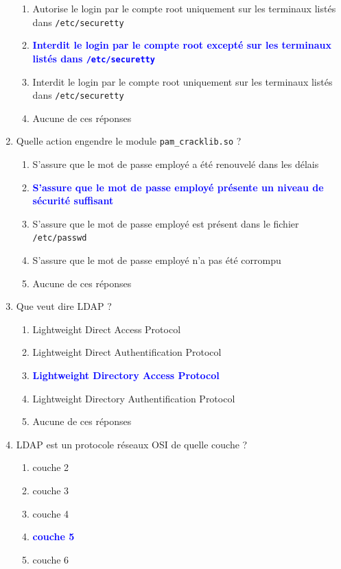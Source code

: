 \documentclass[a4paper]{article}
\begin{document}
\begin{enumerate}
\begin{enumerate}
        \item Autorise le login par le compte root uniquement sur les terminaux listés dans \texttt{/etc/securetty}
        \item \textcolor{blue}{\textbf{Interdit le login par le compte root excepté sur les terminaux listés dans \texttt{/etc/securetty}}}
        \item Interdit le login par le compte root uniquement sur les terminaux listés dans \texttt{/etc/securetty}
        \item Aucune de ces réponses
    \end{enumerate}
    \item Quelle action engendre le module \texttt{pam\_cracklib.so} ?
    \begin{enumerate}
        \item S'assure que le mot de passe employé a été renouvelé dans les délais
        \item \textcolor{blue}{\textbf{S'assure que le mot de passe employé présente un niveau de sécurité suffisant}}
        \item S'assure que le mot de passe employé est présent dans le fichier \texttt{/etc/passwd}
        \item S'assure que le mot de passe employé n'a pas été corrompu
        \item Aucune de ces réponses
    \end{enumerate}
    \item Que veut dire LDAP ?
    \begin{enumerate}
        \item Lightweight Direct Access Protocol
        \item Lightweight Direct Authentification Protocol
        \item \textcolor{blue}{\textbf{Lightweight Directory Access Protocol}}
        \item Lightweight Directory Authentification Protocol
        \item Aucune de ces réponses
    \end{enumerate}
    \item LDAP est un protocole réseaux OSI de quelle couche ?
    \begin{enumerate}
        \item couche 2
        \item couche 3
        \item couche 4
        \item \textcolor{blue}{\textbf{couche 5}}
        \item couche 6

\end{enumerate}
\end{enumerate}
\end{document}
